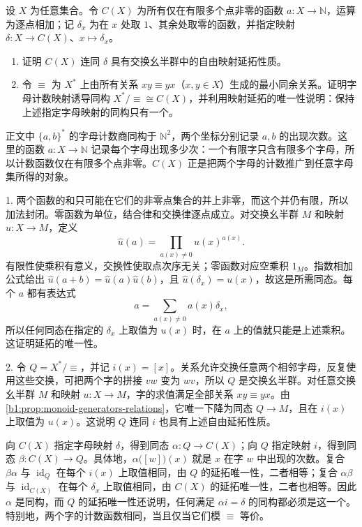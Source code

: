 \begin{exercise}\label{b1:ex:01-free-commutative}
	设 \(X\) 为任意集合。令 \(C(X)\) 为所有仅在有限多个点非零的函数 \(a:X\rightarrow\mathbb N\)，运算为逐点相加；记 \(\delta_x\) 为在 \(x\) 处取 \(1\)、其余处取零的函数，并指定映射 \(\delta:X\rightarrow C(X)\)、\(x\mapsto\delta_x\)。
	\begin{enumerate}
		\item 证明 \(C(X)\) 连同 \(\delta\) 具有交换幺半群中的自由映射延拓性质。
		\item 令 \(\equiv\) 为 \(X^*\) 上由所有关系 \(xy\equiv yx\)（\(x,y\in X\)）生成的最小同余关系。证明字母计数映射诱导同构 \(X^*/{\equiv}\cong C(X)\)，并利用映射延拓的唯一性说明：保持上述指定字母映射的同构只有一个。
	\end{enumerate}

\end{exercise}
\begin{solution}
	正文中 \(\{a,b\}^*\) 的字母计数商同构于 \(\mathbb N^2\)，两个坐标分别记录 \(a,b\) 的出现次数。这里的函数 \(a:X\rightarrow\mathbb N\) 记录每个字母出现多少次：一个有限字只含有限多个字母，所以计数函数仅在有限多个点非零。\(C(X)\) 正是把两个字母的计数推广到任意字母集所得的对象。

	1. 两个函数的和只可能在它们的非零点集合的并上非零，而这个并仍有限，所以加法封闭。零函数为单位，结合律和交换律逐点成立。对交换幺半群 \(M\) 和映射 \(u:X\rightarrow M\)，定义
	\[
		\widehat u(a)=\prod_{a(x)\ne0}u(x)^{a(x)}.
	\]
	有限性使乘积有意义，交换性使取点次序无关；零函数对应空乘积 \(1_M\)。指数相加公式给出 \(\widehat u(a+b)=\widehat u(a)\widehat u(b)\)，且 \(\widehat u(\delta_x)=u(x)\)，故这是所需同态。每个 \(a\) 都有表达式
	\[
		a=\sum_{a(x)\ne0}a(x)\delta_x,
	\]
	所以任何同态在指定的 \(\delta_x\) 上取值为 \(u(x)\) 时，在 \(a\) 上的值就只能是上述乘积。这证明延拓的唯一性。

	2. 令 \(Q=X^*/{\equiv}\)，并记 \(i(x)=[x]\)。关系允许交换任意两个相邻字母，反复使用这些交换，可把两个字的拼接 \(vw\) 变为 \(wv\)，所以 \(Q\) 是交换幺半群。对任意交换幺半群 \(M\) 和映射 \(u:X\rightarrow M\)，字的求值满足全部关系 \(xy\equiv yx\)。由\cref{b1:prop:monoid-generators-relations}，它唯一下降为同态 \(Q\rightarrow M\)，且在 \(i(x)\) 上取值为 \(u(x)\)。这说明 \(Q\) 连同 \(i\) 也具有上述自由延拓性质。

	向 \(C(X)\) 指定字母映射 \(\delta\)，得到同态 \(\alpha:Q\rightarrow C(X)\)；向 \(Q\) 指定映射 \(i\)，得到同态 \(\beta:C(X)\rightarrow Q\)。具体地，\(\alpha\bigl([w]\bigr)(x)\) 就是 \(x\) 在字 \(w\) 中出现的次数。复合 \(\beta\alpha\) 与 \(\operatorname{id}_Q\) 在每个 \(i(x)\) 上取值相同，由 \(Q\) 的延拓唯一性，二者相等；复合 \(\alpha\beta\) 与 \(\operatorname{id}_{C(X)}\) 在每个 \(\delta_x\) 上取值相同，由 \(C(X)\) 的延拓唯一性，二者也相等。因此 \(\alpha\) 是同构，而 \(Q\) 的延拓唯一性还说明，任何满足 \(\alpha i=\delta\) 的同构都必须是这一个。特别地，两个字的计数函数相同，当且仅当它们模 \(\equiv\) 等价。
\end{solution}

